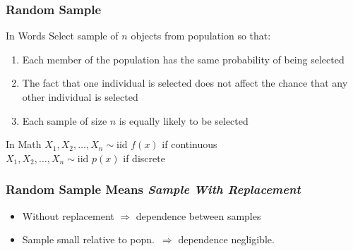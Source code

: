 \documentclass{beamer}
\begin{document}
\begin{frame}
\frametitle{Random Sample}

\begin{block}{In Words}
Select sample of $n$ objects from  population so that:
	\begin{enumerate}
\item Each member of the population has the same probability of being selected 
\item The fact that one individual is selected does not affect the chance that any other individual is selected
\item Each sample of size $n$ is equally likely to be selected

\end{enumerate}
\end{block}

\begin{alertblock}{In Math}
	$X_1, X_2, \hdots, X_n \sim \mbox{iid } f(x)$ if continuous\\
  $X_1, X_2, \hdots, X_n \sim \mbox{iid } p(x)$ if discrete
\end{alertblock}

\end{frame}

\begin{frame}
  \frametitle{Random Sample Means \emph{Sample With Replacement}}


\begin{itemize}
  \item Without replacement $\Rightarrow$ dependence between samples
  \item Sample small relative to popn.\ $\Rightarrow$ dependence negligible.
\end{itemize}
\end{frame}
\end{document}
